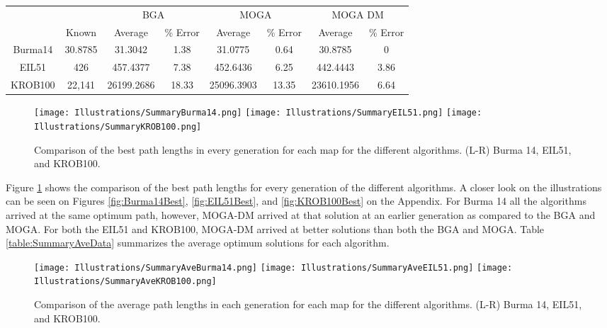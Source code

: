 \begin{table*}[h]
	\begin{center}
		\begin{tabular}{ c c| c c| c c| c c|}
			& &  \multicolumn{2}{c|}{BGA} & \multicolumn{2}{c|}{MOGA} & \multicolumn{2}{c|}{MOGA DM} \\ 
			& Known  & Average & \% Error & Average & \% Error & Average & \% Error \\
			\hline
			Burma14  & 30.8785& 31.3042 & 1.38 & 31.0775 & 0.64 & 30.8785 & 0   \\
			EIL51 &  426& 457.4377 & 7.38 &  452.6436 & 6.25 & 442.4443& 3.86  \\
			KROB100 &  22,141 & 26199.2686 & 18.33& 25096.3903 &13.35 & 23610.1956 & 6.64\\
		\end{tabular}
		\caption{The average optimum solutions for each algorithm}
		\label{table:SummaryAveData}
	\end{center}
\end{table*}


\begin{figure}[htp]
	
	\centering
	\texttt{[image: Illustrations/SummaryBurma14.png]}\hfill
	\texttt{[image: Illustrations/SummaryEIL51.png]}\hfill
	\texttt{[image: Illustrations/SummaryKROB100.png]}
	
	\caption{Comparison of the best path lengths in every generation for each map for the different algorithms. (L-R) Burma 14, EIL51, and KROB100.}
	\label{fig:BestLengthsSummary}
	
\end{figure}

Figure \ref{fig:BestLengthsSummary} shows the comparison of the best path lengths for every generation of the different algorithms. A closer look on the illustrations can be seen on Figures \ref{fig:Burma14Best}, \ref{fig:EIL51Best}, and  \ref{fig:KROB100Best} on the Appendix. For Burma 14 all the algorithms arrived at the same optimum path, however, MOGA-DM arrived at that solution at an earlier generation as compared to the BGA and MOGA. For both the EIL51 and KROB100, MOGA-DM arrived at better solutions than both the BGA and MOGA. Table \ref{table:SummaryAveData} summarizes the average optimum solutions for each algorithm. 

\begin{figure}[htp]
	
	\centering
	\texttt{[image: Illustrations/SummaryAveBurma14.png]}\hfill
	\texttt{[image: Illustrations/SummaryAveEIL51.png]}\hfill
	\texttt{[image: Illustrations/SummaryAveKROB100.png]}
	
	\caption{Comparison of the average path lengths in each generation for each map for the different algorithms. (L-R) Burma 14, EIL51, and KROB100.}
	\label{fig:AverageSummary}
	
\end{figure}

